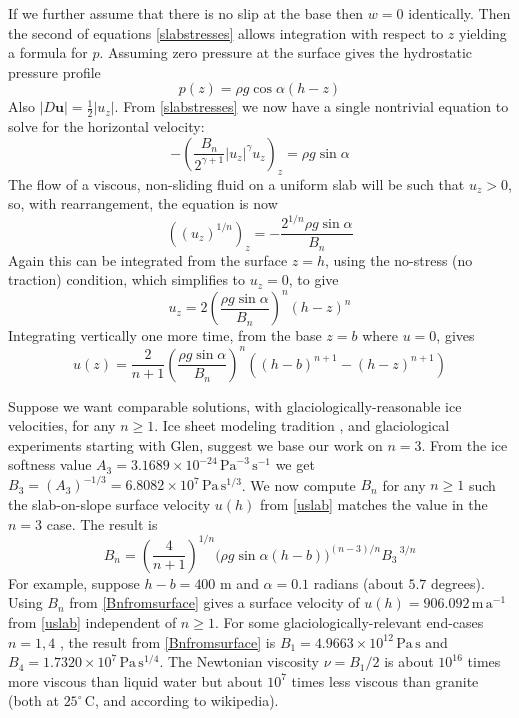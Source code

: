 \documentclass[letterpaper,final,12pt,reqno]{amsart}
\newcommand{\bu}{\mathbf{u}}
\begin{document}
If we further assume that there is no slip at the base then $w=0$ identically.  Then the second of equations \eqref{slabstresses} allows integration with respect to $z$ yielding a formula for $p$.  Assuming zero pressure at the surface gives the hydrostatic pressure profile
\begin{equation}
p(z) = \rho g\cos\alpha (h-z)  \label{pslab}
\end{equation}
Also $|D\bu| = \frac{1}{2} |u_z|$.  From \eqref{slabstresses} we now have a single nontrivial equation to solve for the horizontal velocity:
    $$- \left(\frac{B_n}{2^{\gamma+1}} |u_z|^\gamma u_z\right)_z = \rho g\sin\alpha$$
The flow of a viscous, non-sliding fluid on a uniform slab will be such that $u_z>0$, so, with rearrangement, the equation is now
    $$\left((u_z)^{1/n} \right)_z = - \frac{2^{1/n} \rho g\sin\alpha}{B_n}$$
Again this can be integrated from the surface $z=h$, using the no-stress (no traction) condition, which simplifies to $u_z=0$, to give
\begin{equation}
u_z = 2 \left(\frac{\rho g\sin\alpha}{B_n}\right)^n (h-z)^n  \label{uzslab}
\end{equation}
Integrating vertically one more time, from the base $z=b$ where $u=0$, gives
\begin{equation}
u(z) = \frac{2}{n+1} \left(\frac{\rho g\sin\alpha}{B_n}\right)^n \left((h-b)^{n+1} - (h-z)^{n+1}\right)  \label{uslab}
\end{equation}

Suppose we want comparable solutions, with glaciologically-reasonable ice velocities, for any $n\ge 1$.  Ice sheet modeling tradition \cite{GreveBlatter2009}, and glaciological experiments starting with Glen, suggest we base our work on $n=3$.  From the ice softness value $A_3 = 3.1689 \times 10^{-24} \,\text{Pa}^{-3}\,\text{s}^{-1}$ we get $B_3 = (A_3)^{-1/3} = 6.8082\times 10^7\,\text{Pa}\,\text{s}^{1/3}$.  We now compute $B_n$ for any $n\ge 1$ such the slab-on-slope surface velocity $u(h)$ from \eqref{uslab} matches the value in the $n=3$ case.  The result is
\begin{equation}
B_n = \left(\frac{4}{n+1}\right)^{1/n} \Big(\rho g \sin\alpha (h-b)\Big)^{(n-3)/n} {B_3\,}^{3/n}  \label{Bnfromsurface}
\end{equation}
For example, suppose $h-b=400$ m and $\alpha=0.1$ radians (about $5.7$ degrees).  Using $B_n$ from \eqref{Bnfromsurface} gives a surface velocity of $u(h)=906.092 \,\text{m}\,\text{a}^{-1}$ from \eqref{uslab} independent of $n\ge 1$.  For some glaciologically-relevant end-cases $n=1,4$ \cite{GreveBlatter2009}, the result from \eqref{Bnfromsurface} is $B_1=4.9663\times 10^{12}\,\text{Pa}\,\text{s}$ and $B_4=1.7320\times 10^{7}\,\text{Pa}\,\text{s}^{1/4}$.  The Newtonian viscosity $\nu=B_1/2$ is about $10^{16}$ times more viscous than liquid water but about $10^7$ times less viscous than granite (both at $25^\circ \,\text{C}$, and according to wikipedia).
\end{document}
